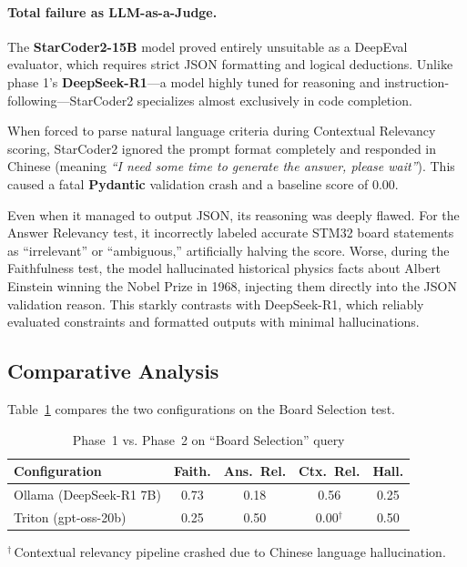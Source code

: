 \paragraph{Total failure as LLM-as-a-Judge.} The \textbf{StarCoder2-15B} model proved entirely unsuitable as a DeepEval evaluator, which requires strict JSON formatting and logical deductions. Unlike phase 1's \textbf{DeepSeek-R1}---a model highly tuned for reasoning and instruction-following---StarCoder2 specializes almost exclusively in code completion.

When forced to parse natural language criteria during Contextual Relevancy scoring, StarCoder2 ignored the prompt format completely and responded in Chinese (meaning \textit{``I need some time to generate the answer, please wait''}). This caused a fatal \textbf{Pydantic} validation crash and a baseline score of 0.00.

Even when it managed to output JSON, its reasoning was deeply flawed. For the Answer Relevancy test, it incorrectly labeled accurate STM32 board statements as ``irrelevant'' or ``ambiguous,'' artificially halving the score. Worse, during the Faithfulness test, the model hallucinated historical physics facts about Albert Einstein winning the Nobel Prize in 1968, injecting them directly into the JSON validation reason. This starkly contrasts with DeepSeek-R1, which reliably evaluated constraints and formatted outputs with minimal hallucinations.

\subsection{Comparative Analysis}

Table~\ref{tab:deepeval-comparison} compares the two configurations on the Board Selection test.

\begin{table}[ht]
    \centering
    \caption{Phase~1 vs. Phase~2 on ``Board Selection'' query}
    \label{tab:deepeval-comparison}
    \begin{tabular}{|l|c|c|c|c|}
        \hline
        \textbf{Configuration}  & \textbf{Faith.} & \textbf{Ans.\ Rel.} & \textbf{Ctx.\ Rel.} & \textbf{Hall.} \\
        \hline
        Ollama (DeepSeek-R1 7B) & 0.73            & 0.18                & 0.56                & 0.25           \\
        Triton (gpt-oss-20b)    & 0.25            & 0.50                & 0.00$^{\dagger}$    & 0.50           \\
        \hline
    \end{tabular}
    \vspace{3pt}

    {\small $^{\dagger}$\,Contextual relevancy pipeline crashed due to Chinese language hallucination.}
\end{table}

